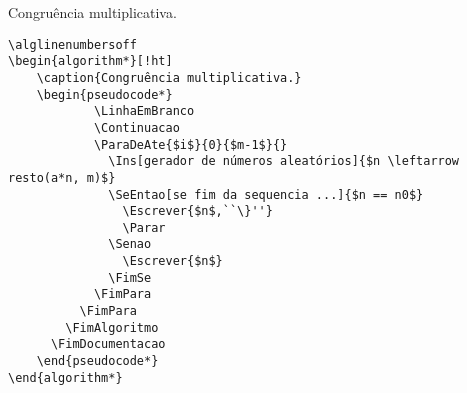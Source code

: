 \documentclass[a4paper,12pt,oneside,onecolumn]{article}
\begin{document}
\begin{algorithm}[!ht]
    \caption{Congruência multiplicativa.} \label{alg:congmult}
    \begin{pseudocode}
      \LinhaEmBranco
      \Documentacao
            \Continua
    \end{pseudocode}
\end{algorithm}

\begin{verbatim}
\alglinenumbersoff
\begin{algorithm*}[!ht]
    \caption{Congruência multiplicativa.}
    \begin{pseudocode*}
            \LinhaEmBranco
            \Continuacao
            \ParaDeAte{$i$}{0}{$m-1$}{}
              \Ins[gerador de números aleatórios]{$n \leftarrow resto(a*n, m)$}
              \SeEntao[se fim da sequencia ...]{$n == n0$}
                \Escrever{$n$,``\}''}
                \Parar
              \Senao
                \Escrever{$n$}
              \FimSe
            \FimPara
          \FimPara
        \FimAlgoritmo
      \FimDocumentacao
    \end{pseudocode*}
\end{algorithm*}
\end{verbatim}
\end{document}
